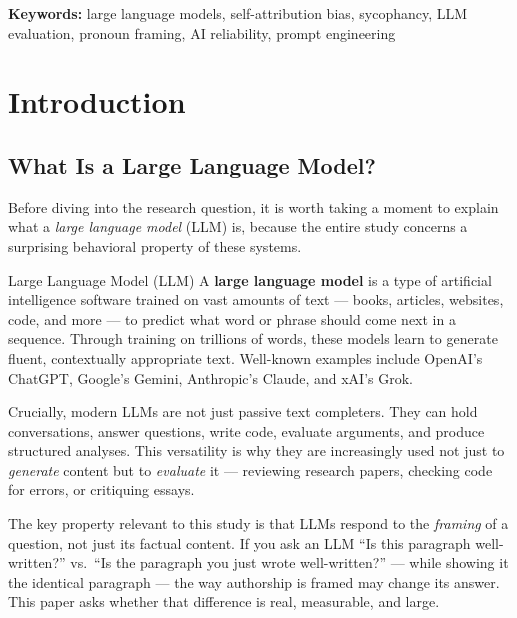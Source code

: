 \documentclass[12pt, letterpaper]{article}
\begin{document}
\begin{titlepage}
  \vspace{1.5cm}
  \noindent\textbf{Keywords:} large language models, self-attribution bias, sycophancy,
  LLM evaluation, pronoun framing, AI reliability, prompt engineering
\end{titlepage}

\tableofcontents
\newpage

\section{Introduction}

\subsection{What Is a Large Language Model?}

Before diving into the research question, it is worth taking a moment to explain what
a \emph{large language model} (LLM) is, because the entire study concerns a surprising
behavioral property of these systems.

\begin{keyconcept}{Large Language Model (LLM)}
  A \textbf{large language model} is a type of artificial intelligence software trained
  on vast amounts of text --- books, articles, websites, code, and more --- to predict
  what word or phrase should come next in a sequence. Through training on trillions of
  words, these models learn to generate fluent, contextually appropriate text. Well-known
  examples include OpenAI's ChatGPT, Google's Gemini, Anthropic's Claude, and xAI's Grok.

  Crucially, modern LLMs are not just passive text completers. They can hold conversations,
  answer questions, write code, evaluate arguments, and produce structured analyses. This
  versatility is why they are increasingly used not just to \emph{generate} content but to
  \emph{evaluate} it --- reviewing research papers, checking code for errors, or critiquing
  essays.
\end{keyconcept}

The key property relevant to this study is that LLMs respond to the \emph{framing} of
a question, not just its factual content. If you ask an LLM ``Is this paragraph well-written?''
vs.\ ``Is the paragraph you just wrote well-written?'' --- while showing it the identical
paragraph --- the way authorship is framed may change its answer. This paper asks whether
that difference is real, measurable, and large.
\end{document}
